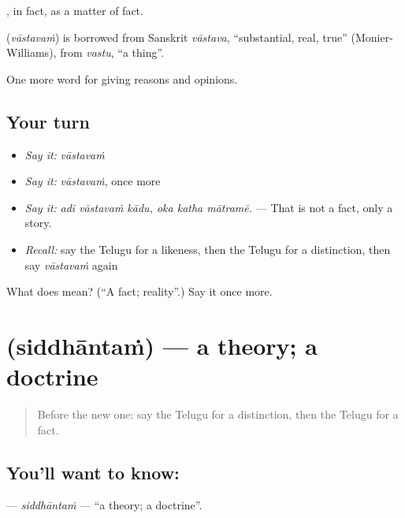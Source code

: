 , in fact, as a matter of fact.

\begin{cousinweb}
\textbf{} (\emph{vāstavaṁ}) is borrowed from Sanskrit \emph{vāstava}, \textquotedblleft{}substantial, real, true\textquotedblright{} (Monier-Williams), from \emph{vastu}, \textquotedblleft{}a thing\textquotedblright{}.
\end{cousinweb}

\begin{grammarlens}[title={What you've built}]
One more word for giving reasons and opinions.
\end{grammarlens}

\subsection*{Your turn}
\begin{itemize}
\raggedright
  \item \emph{Say it:} \emph{vāstavaṁ}
  \item \emph{Say it:} \emph{vāstavaṁ}, once more
  \item \emph{Say it:} \emph{adi vāstavaṁ kādu, oka katha mātramē.} — That is not a fact, only a story.
  \item \emph{Recall:} say the Telugu for a likeness, then the Telugu for a distinction, then say \emph{vāstavaṁ} again
\end{itemize}

\begin{tcolorbox}[breakable,colback=teal!4,colframe=teal!35!black,title={Before you move on}]
What does  mean? (\textquotedblleft{}A fact; reality\textquotedblright{}.) Say it once more.
\end{tcolorbox}
\section[\texorpdfstring{\te{సిద్ధాంతం} (siddhāntaṁ)}{సిద్ధాంతం (siddhāntaṁ)}]{ (siddhāntaṁ) — a theory; a doctrine}

\label{lesson:TE-C390-siddhantam}



\begin{quote}
Before the new one: say the Telugu for a distinction, then the Telugu for a fact.
\end{quote}

\subsection*{You'll want to know: }
\textbf{} — \emph{siddhāntaṁ} — \textquotedblleft{}a theory; a doctrine\textquotedblright{}.

